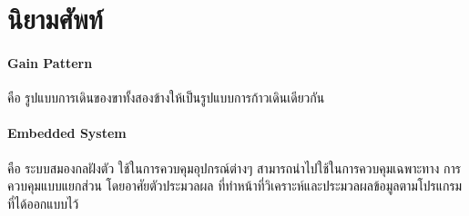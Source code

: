 \clearpage
\section{นิยามศัพท์}
\paragraph*{Gain Pattern}
คือ รูปแบบการเดินของขาทั้งสองข้างให้เป็นรูปแบบการก้าวเดินเดียวกัน

\paragraph*{Embedded System}
คือ ระบบสมองกลฝังตัว ใช้ในการควบคุมอุปกรณ์ต่างๆ สามารถนำไปใช้ในการควบคุมเฉพาะทาง
การควบคุมแบบแยกส่วน โดยอาศัยตัวประมวลผล ที่ทำหน้าที่วิเคราะห์และประมวลผลข้อมูลตามโปรแกรมที่ได้ออกแบบไว้
